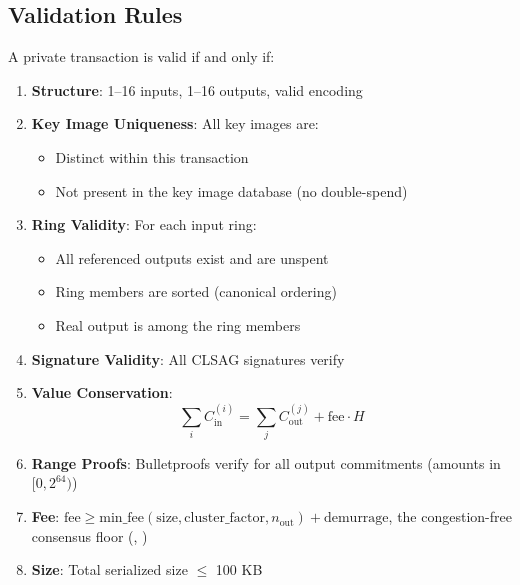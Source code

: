 \subsection{Validation Rules}

A private transaction is valid if and only if:

\begin{enumerate}
  \item \textbf{Structure}: 1--16 inputs, 1--16 outputs, valid encoding

  \item \textbf{Key Image Uniqueness}: All key images are:
    \begin{itemize}
      \item Distinct within this transaction
      \item Not present in the key image database (no double-spend)
    \end{itemize}

  \item \textbf{Ring Validity}: For each input ring:
    \begin{itemize}
      \item All referenced outputs exist and are unspent
      \item Ring members are sorted (canonical ordering)
      \item Real output is among the ring members
    \end{itemize}

  \item \textbf{Signature Validity}: All CLSAG signatures verify

  \item \textbf{Value Conservation}:
    \begin{equation}
    \sum_i C_{\text{in}}^{(i)} = \sum_j C_{\text{out}}^{(j)} + \text{fee} \cdot H
    \end{equation}

  \item \textbf{Range Proofs}: Bulletproofs verify for all output
    commitments (amounts in $[0, 2^{64})$)

  \item \textbf{Fee}: $\text{fee} \geq \text{min\_fee}(\text{size}, \text{cluster\_factor}, n_{\text{out}}) + \text{demurrage}$,
    the congestion-free consensus floor
    (,
    )

  \item \textbf{Size}: Total serialized size $\leq$ 100 KB
\end{enumerate}

